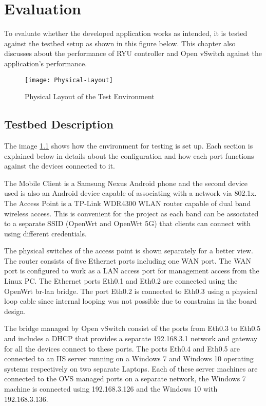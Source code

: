 \chapter{Evaluation}\label{ch:Evaluation}
To evaluate whether the developed application works as intended, it is tested against the testbed setup as shown in this figure below. This chapter also discusses about the performance of RYU controller and Open vSwitch against the application’s performance.

  \begin{figure}
	\centering
	\texttt{[image: Physical-Layout]}
	\caption {Physical Layout of the Test Environment}
	\label{fig:test-layout}
	\vspace{-10pt}
  \end{figure}

\section{Testbed Description}
The image \ref{fig:test-layout} shows how the environment for testing is set up. Each section is explained below in details about the configuration and how each port functions against the devices connected to it.

The Mobile Client is a Samsung Nexus Android phone and the second device used is also an Android device capable of associating with a network via 802.1x. The Access Point is a TP-Link WDR4300 WLAN router capable of dual band wireless access. This is convenient for the project as each band can be associated to a separate SSID (OpenWrt and OpenWrt 5G) that clients can connect with using different credentials.

The physical switches of the access point is shown separately for a better view. The router consists of five Ethernet ports including one WAN port. The WAN port is configured to work as a LAN access port for management access from the Linux PC. The Ethernet ports Eth0.1 and Eth0.2 are connected using the OpenWrt br-lan bridge. The port Eth0.2 is connected to Eth0.3 using a physical loop cable since internal looping was not possible due to constrains in the board design.

The bridge managed by Open vSwitch consist of the ports from Eth0.3 to Eth0.5 and includes a DHCP that provides a separate 192.168.3.1 network and gateway for all the devices connect to these ports. The ports Eth0.4 and Eth0.5 are connected to an IIS server running on a Windows 7 and Windows 10 operating systems respectively on two separate Laptops. Each of these server machines are connected to the OVS managed ports on a separate network, the Windows 7 machine is connected using 192.168.3.126 and the Windows 10 with 192.168.3.136.

